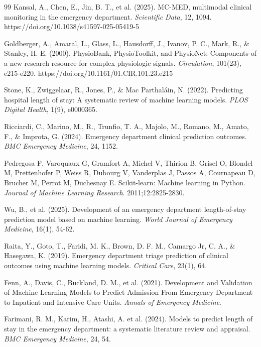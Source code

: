 \documentclass[harvard,article]{frontiersinFPHY_FAMS}
\begin{document}
\begin{thebibliography}{99}
 Kansal, A., Chen, E., Jin, B. T., et al. (2025). MC-MED, multimodal clinical monitoring in the emergency department. \textit{Scientific Data}, 12, 1094. https://doi.org/10.1038/s41597-025-05419-5

 Goldberger, A., Amaral, L., Glass, L., Hausdorff, J., Ivanov, P. C., Mark, R., \& Stanley, H. E. (2000). PhysioBank, PhysioToolkit, and PhysioNet: Components of a new research resource for complex physiologic signals. \textit{Circulation}, 101(23), e215-e220. https://doi.org/10.1161/01.CIR.101.23.e215

 Stone, K., Zwiggelaar, R., Jones, P., \& Mac Parthaláin, N. (2022). Predicting hospital length of stay: A systematic review of machine learning models. \textit{PLOS Digital Health}, 1(9), e0000365.

 Ricciardi, C., Marino, M., R., Trunfio, T. A., Majolo, M., Romano, M., Amato, F., \& Improta, G. (2024). Emergency department clinical prediction outcomes. \textit{BMC Emergency Medicine}, 24, 1152.

Pedregosa F, Varoquaux G, Gramfort A, Michel V, Thirion B, Grisel O, Blondel M, Prettenhofer P, Weiss R, Dubourg V, Vanderplas J, Passos A, Cournapeau D, Brucher M, Perrot M, Duchesnay E.
\newblock Scikit-learn: Machine learning in Python.
\newblock \textit{Journal of Machine Learning Research}. 2011;12:2825-2830.

 Wu, B., et al. (2025). Development of an emergency department length-of-stay prediction model based on machine learning. \textit{World Journal of Emergency Medicine}, 16(1), 54-62.

 Raita, Y., Goto, T., Faridi, M. K., Brown, D. F. M., Camargo Jr, C. A., \& Hasegawa, K. (2019). Emergency department triage prediction of clinical outcomes using machine learning models. \textit{Critical Care}, 23(1), 64.

 Fenn, A., Davis, C., Buckland, D. M., et al. (2021). Development and Validation of Machine Learning Models to Predict Admission From Emergency Department to Inpatient and Intensive Care Units. \textit{Annals of Emergency Medicine}.

 Farimani, R. M., Karim, H., Atashi, A. et al. (2024). Models to predict length of stay in the emergency department: a systematic literature review and appraisal. \textit{BMC Emergency Medicine}, 24, 54.


\end{thebibliography}
\end{document}
